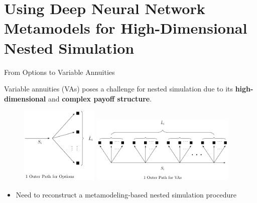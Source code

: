 \documentclass[9pt,handout]{beamer}
\begin{document}
\section{Using Deep Neural Network Metamodels for High-Dimensional Nested Simulation}

\begin{frame}{From Options to Variable Annuities}

    Variable annuities (VAs) poses a challenge for nested simulation due to its \textbf{high-dimensional} and \textbf{complex payoff structure}.

    \vspace{10pt}

    \begin{figure}[H]
            \includegraphics[width=0.33\textwidth]{./tikz/illustration_spns.pdf}
            \includegraphics[width=0.62\textwidth]{./tikz/illustration_mpns.pdf}
	\end{figure}

    \vspace{10pt}

    \begin{itemize}
        \item Need to reconstruct a metamodeling-based nested simulation procedure
    \end{itemize}

\end{frame}
\end{document}
